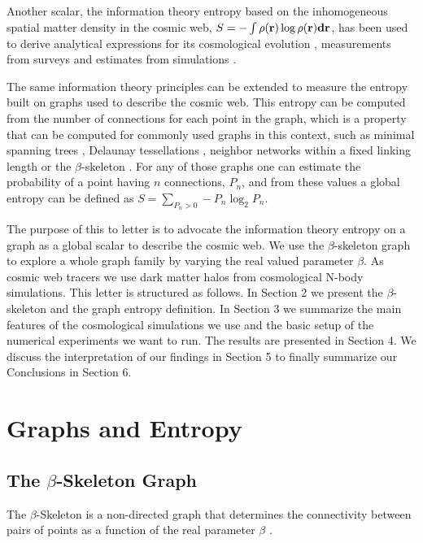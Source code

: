 \documentclass[fleqn,usenatbib]{mnras}
\begin{document}
Another scalar, the information theory entropy based on the inhomogeneous 
spatial matter density in the cosmic web,
$S=-\int\rho(\bf{r})\log\rho(\bf{r}) d\bf{r}$, has
been used to derive analytical expressions for its cosmological evolution
\citep{2004PhRvL..92n1302H}, measurements from surveys
\citep{2015MNRAS.454.2647P}
and estimates from simulations \citep{2020MNRAS.491.5447V}.

The same information theory principles can be extended to measure the entropy built 
on graphs  used to describe the cosmic web. 
This entropy can be computed from the number of connections for each
point in the graph,  which is a property that  can be computed for commonly used graphs in
this context, such as  minimal spanning trees
\citep{1985MNRAS.216...17B}, Delaunay tessellations 
\citep{2007MNRAS.382....2R}, neighbor networks within a fixed linking
length \citep{2016MNRAS.459.2690H} or the $\beta$-skeleton
\citep{2019MNRAS.485.5276F}.   
For any of those graphs one can estimate the probability of a point
having $n$ connections, $P_n$, and from these values a global entropy
can be defined as $S = \sum_{P_n>0}-P_n\log_2{P_n}$. 

The purpose of this to letter is to advocate the information theory entropy on a graph
as a global scalar to describe the cosmic web.
We use the $\beta$-skeleton graph to explore a whole graph family 
by varying the real valued parameter $\beta$.
As cosmic web tracers we use dark matter halos from cosmological N-body simulations. 
This letter is structured as follows. 
In Section 2 we present the $\beta$-skeleton and the graph entropy definition.
In Section 3 we summarize the main features of the cosmological simulations we use and 
the basic setup of the numerical experiments we want to run.
The results are presented in Section 4.
We discuss the interpretation of our findings in Section
5 to finally summarize our Conclusions in Section 6.  

\section{Graphs and Entropy}

\subsection{The $\beta$-Skeleton Graph}

The $\beta$-Skeleton is a non-directed graph that determines the
connectivity between pairs of points as a function of the real
parameter $\beta$ \citep{1985Kirkpatrick}. 
\end{document}
